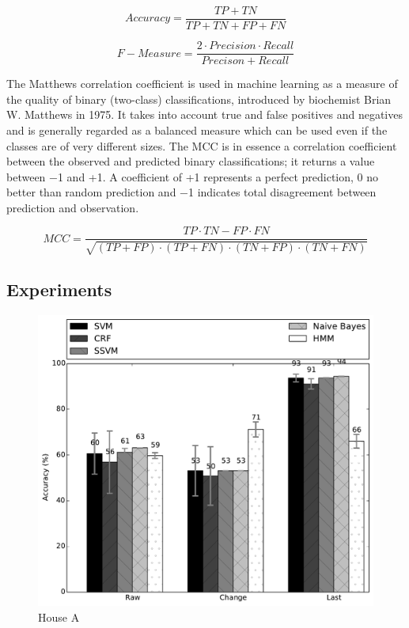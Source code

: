 \documentclass[11pt, oneside]{article}   	%
\begin{document}
\begin{equation}
Accuracy = \frac{TP+TN}{TP+TN+FP+FN}
\end{equation}

\begin{equation}
F-Measure = \frac{2\cdot Precision\cdot Recall}{Precison+Recall}
\end{equation}

The Matthews correlation coefficient is used in machine learning as a measure of the quality of binary (two-class) classifications, introduced by biochemist Brian W. Matthews in 1975. It takes into account true and false positives and negatives and is generally regarded as a balanced measure which can be used even if the classes are of very different sizes. The MCC is in essence a correlation coefficient between the observed and predicted binary classifications; it returns a value between −1 and +1. A coefficient of +1 represents a perfect prediction, 0 no better than random prediction and −1 indicates total disagreement between prediction and observation.

\begin{equation}
MCC=\frac{TP\cdot TN-FP\cdot FN}{\sqrt{(TP+FP)\cdot (TP+FN)\cdot (TN+FP)\cdot (TN+FN)}}
\end{equation}


\subsection{Experiments}
\begin{figure}[t!]
\begin{center}
\includegraphics[width=5in]{../../src/reports/A.pdf}
\end{center}
\vspace{-0.5cm}
\caption{House A}
\label{fig:house_a}
\vspace{-0.5cm}
\end{figure}
\end{document}
